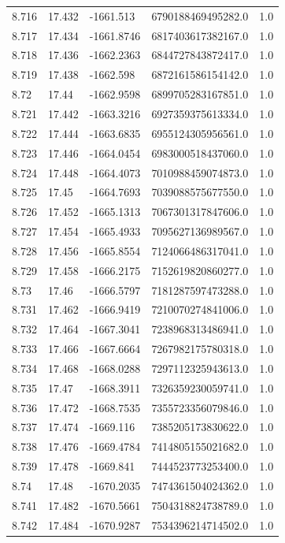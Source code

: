 \begin{tabular}{lllll}
8.716 & 17.432 & -1661.513 & 6790188469495282.0 & 1.0 \\
8.717 & 17.434 & -1661.8746 & 6817403617382167.0 & 1.0 \\
8.718 & 17.436 & -1662.2363 & 6844727843872417.0 & 1.0 \\
8.719 & 17.438 & -1662.598 & 6872161586154142.0 & 1.0 \\
8.72 & 17.44 & -1662.9598 & 6899705283167851.0 & 1.0 \\
8.721 & 17.442 & -1663.3216 & 6927359375613334.0 & 1.0 \\
8.722 & 17.444 & -1663.6835 & 6955124305956561.0 & 1.0 \\
8.723 & 17.446 & -1664.0454 & 6983000518437060.0 & 1.0 \\
8.724 & 17.448 & -1664.4073 & 7010988459074873.0 & 1.0 \\
8.725 & 17.45 & -1664.7693 & 7039088575677550.0 & 1.0 \\
8.726 & 17.452 & -1665.1313 & 7067301317847606.0 & 1.0 \\
8.727 & 17.454 & -1665.4933 & 7095627136989567.0 & 1.0 \\
8.728 & 17.456 & -1665.8554 & 7124066486317041.0 & 1.0 \\
8.729 & 17.458 & -1666.2175 & 7152619820860277.0 & 1.0 \\
8.73 & 17.46 & -1666.5797 & 7181287597473288.0 & 1.0 \\
8.731 & 17.462 & -1666.9419 & 7210070274841006.0 & 1.0 \\
8.732 & 17.464 & -1667.3041 & 7238968313486941.0 & 1.0 \\
8.733 & 17.466 & -1667.6664 & 7267982175780318.0 & 1.0 \\
8.734 & 17.468 & -1668.0288 & 7297112325943613.0 & 1.0 \\
8.735 & 17.47 & -1668.3911 & 7326359230059741.0 & 1.0 \\
8.736 & 17.472 & -1668.7535 & 7355723356079846.0 & 1.0 \\
8.737 & 17.474 & -1669.116 & 7385205173830622.0 & 1.0 \\
8.738 & 17.476 & -1669.4784 & 7414805155021682.0 & 1.0 \\
8.739 & 17.478 & -1669.841 & 7444523773253400.0 & 1.0 \\
8.74 & 17.48 & -1670.2035 & 7474361504024362.0 & 1.0 \\
8.741 & 17.482 & -1670.5661 & 7504318824738789.0 & 1.0 \\
8.742 & 17.484 & -1670.9287 & 7534396214714502.0 & 1.0 \\

\end{tabular}
